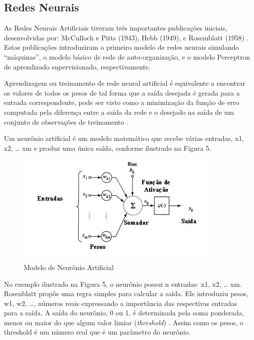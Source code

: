 \documentclass[conference]{IEEEtran}
\begin{document}
	
	\subsection{Redes Neurais}

As Redes Neurais Artificiais tiveram três importantes publicações iniciais, desenvolvidas por: McCulloch e Pitts (1943), Hebb (1949), e Rosemblatt (1958) \cite{perceptron}. Estas publicações introduziram o primeiro modelo de redes neurais simulando “máquinas”, o modelo básico de rede de auto-organização, e o modelo Perceptron de aprendizado supervisionado, respectivamente.
		
    Aprendizagem ou treinamento de rede neural artificial é equivalente a encontrar os valores de todos os pesos de tal forma que a saída desejada é gerada para a entrada correspondente, pode ser visto como a minimização da função de erro computada pela diferença entre a saída da rede e o desejado na saída de um conjunto de observações de treinamento \cite{redes_neurais_apredizagem}.
	
	Um neurônio artificial é um modelo matemático que recebe várias entradas, x1, x2, … xm e produz uma única saída, conforme ilustrado na Figura 5.
	
	\begin{figure}[htbp]
	\centerline{\includegraphics[scale=.7]{imagens/neuronio_artificial.jpg}}
	\caption{Modelo de Neurônio Artificial}
	\label{fig}
	\end{figure}
	
	No exemplo ilustrado na Figura 5, o neurônio possui n entradas: x1, x2, … xm. Rosenblatt propôs uma regra simples para calcular a saída. Ele introduziu pesos, w1, w2, …, números reais expressando a importância das respectivas entradas para a saída. A saída do neurônio, 0 ou 1, é determinada pela soma ponderada, menor ou maior do que algum valor limiar (\textit{threshold}) \cite{reuronio}. Assim como os pesos, o threshold é um número real que é um parâmetro do neurônio. 
\end{document}
